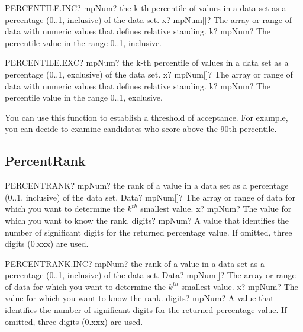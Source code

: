 \vspace{0.6cm}
\begin{mpFunctionsExtract}
	\mpWorksheetFunctionTwoNotImplemented
	{PERCENTILE.INC? mpNum? the k-th percentile of values  in a data set as a percentage (0..1, inclusive) of the data set.}
	{x? mpNum[]?  The array or range of data with numeric values that defines relative standing.}
	{k? mpNum? The percentile value in the range 0..1, inclusive.}
\end{mpFunctionsExtract}


\vspace{0.6cm}
\begin{mpFunctionsExtract}
	\mpWorksheetFunctionTwoNotImplemented
	{PERCENTILE.EXC? mpNum? the k-th percentile of values  in a data set as a percentage (0..1, exclusive) of the data set.}
	{x? mpNum[]?  The array or range of data with numeric values that defines relative standing.}
	{k? mpNum? The percentile value in the range 0..1, exclusive.}
\end{mpFunctionsExtract}


\vspace{0.3cm}
You can use this function to establish a threshold of acceptance. For example, you can decide to examine candidates who score above the 90th percentile.







\subsection{PercentRank}


\begin{mpFunctionsExtract}
	\mpWorksheetFunctionThreeNotImplemented
	{PERCENTRANK? mpNum? the rank of a value in a data set as a percentage (0..1, inclusive) of the data set.}
	{Data? mpNum[]?  The array or range of data for which you want to determine the $k^{th}$ smallest  value.}
	{x? mpNum? The value for which you want to know the rank.}
	{digits? mpNum? A value that identifies the number of significant digits for the returned percentage value. If omitted, three digits (0.xxx) are used.}
\end{mpFunctionsExtract}

\vspace{0.6cm}
\begin{mpFunctionsExtract}
	\mpWorksheetFunctionThreeNotImplemented
	{PERCENTRANK.INC? mpNum? the rank of a value in a data set as a percentage (0..1, inclusive) of the data set.}
	{Data? mpNum[]?  The array or range of data for which you want to determine the $k^{th}$ smallest  value.}
	{x? mpNum? The value for which you want to know the rank.}
	{digits? mpNum? A value that identifies the number of significant digits for the returned percentage value. If omitted, three digits (0.xxx) are used.}
\end{mpFunctionsExtract}

